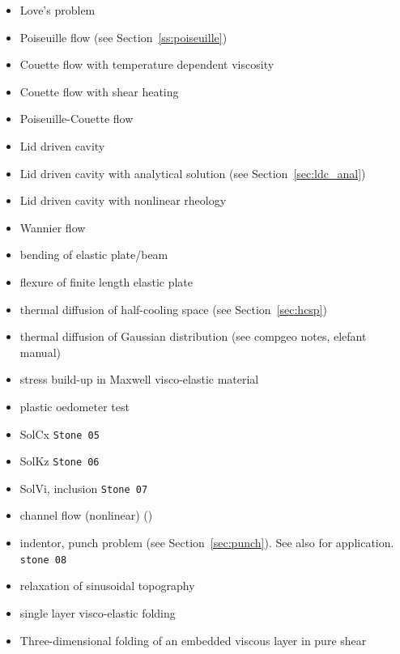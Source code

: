 \begin{itemize}
\item Love's problem \cite{bebe04}
\item Poiseuille flow \cite{fojg94,fuku11,tagm09} (see Section~\ref{ss:poiseuille})
\item Couette flow with temperature dependent viscosity \cite{egat10,demh19}
\item Couette flow with shear heating \cite{egat10}
\item Poiseuille-Couette flow \cite{fusc13}
\item Lid driven cavity \cite{kawa61,chor67,shry78,foth79,ghgs82,kost84,bope98,xika01,brsa06,ertu09}
\item Lid driven cavity with analytical solution (see Section~\ref{sec:ldc_anal})
\item Lid driven cavity with nonlinear rheology \cite{been80,svna18}
\item Wannier flow \cite{wann50,yemu99,cehg14}
\item bending of elastic plate/beam \cite{cehg14,boht08a,vosc15,egat10,demh19,modm02,litu02}
\item flexure of finite length elastic plate \cite{chtl13}
\item thermal diffusion of half-cooling space (see Section~\ref{sec:hcsp}) 
\item thermal diffusion of Gaussian distribution (see compgeo notes, elefant manual)
\item stress build-up in Maxwell visco-elastic material \cite{geyu07,chtl13,egat10,demh19}
\item plastic oedometer test  \cite{chtl13}
\item SolCx \cite{dumg11,gemd13,mamo08,vemmXX,demh19,aspectmanual} {\tt Stone 05}
\item SolKz \cite{dumg11,gemd13,mamo08,vemmXX,demh19,aspectmanual} {\tt Stone 06}
\item SolVi, inclusion \cite{scpo03,kapo06,maie12,deka08,bepo10,sunh10,vosc15,demh19,aspectmanual,litu02} {\tt Stone 07}
\item channel flow (nonlinear) \cite{maie12,frbt19,gery10,egat10} (\bscthesis) 
\item indentor, punch problem (see Section~\ref{sec:punch}). See also \cite{hukm03,fojd04,gerb12} for application. {\tt stone 08}
\item relaxation of sinusoidal topography \cite{crsg12,robh17}
\item single layer visco-elastic folding \cite{scps01,vosc15}
\item Three-dimensional folding of an embedded viscous layer in pure shear \cite{flet91}

\end{itemize}

